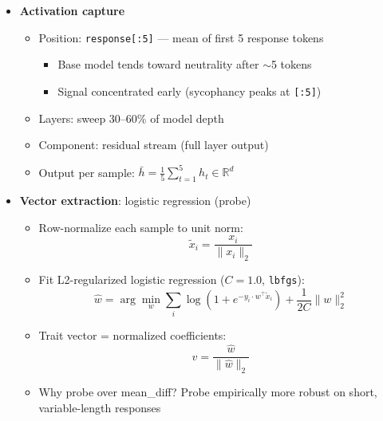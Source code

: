 \documentclass[11pt]{article}
\begin{document}
\begin{itemize}
  \item \textbf{Activation capture}
  \begin{itemize}
    \item Position: \texttt{response[:5]} --- mean of first 5 response tokens
    \begin{itemize}
      \item Base model tends toward neutrality after $\sim$5 tokens
      \item Signal concentrated early (sycophancy peaks at \texttt{[:5]})
    \end{itemize}
    \item Layers: sweep 30--60\% of model depth
    \item Component: residual stream (full layer output)
    \item Output per sample: $\bar{h} = \frac{1}{5}\sum_{t=1}^{5} h_t \in \mathbb{R}^{d}$
  \end{itemize}

  \item \textbf{Vector extraction}: logistic regression (probe)
  \begin{itemize}
    \item Row-normalize each sample to unit norm:
    \begin{equation}
      \tilde{x}_i = \frac{x_i}{\|x_i\|_2}
    \end{equation}
    \item Fit L2-regularized logistic regression ($C=1.0$, \texttt{lbfgs}):
    \begin{equation}
      \hat{w} = \arg\min_w \sum_i \log(1 + e^{-y_i \cdot w^\top \tilde{x}_i}) + \frac{1}{2C}\|w\|_2^2
    \end{equation}
    \item Trait vector = normalized coefficients:
    \begin{equation}
      v = \frac{\hat{w}}{\|\hat{w}\|_2}
    \end{equation}
    \item Why probe over mean\_diff? Probe empirically more robust on short, variable-length responses
  \end{itemize}


\end{itemize}
\end{document}

